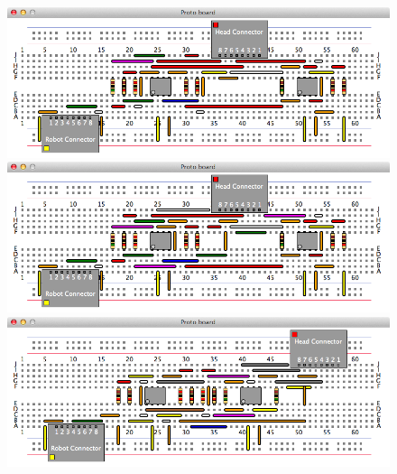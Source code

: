 \begin{figure}[H]
\begin{center}
\includegraphics[width=\textwidth]{Images/exemplar_all_pairs.png}
\includegraphics[width=\textwidth]{Images/exemplar_per_node_increasing.png}
\includegraphics[width=\textwidth]{Images/exemplar_per_node_decreasing.png}
\end{center}
\end{figure}
